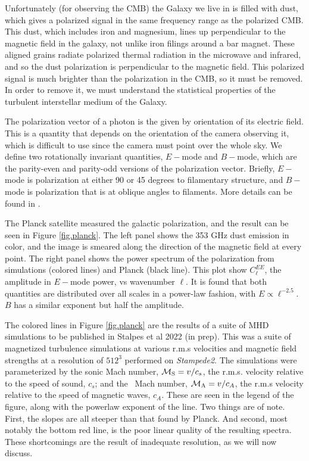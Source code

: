 Unfortunately (for observing the CMB) the Galaxy we live in is filled with dust,
which gives a polarized signal in the same frequency range as the polarized CMB.
This dust, which includes iron and magnesium, lines up perpendicular to the magnetic
field in the galaxy, not unlike iron filings around a bar magnet.  These aligned
grains radiate polarized thermal radiation in the microwave and infrared, and so
the dust polarization is perpendicular to the magnetic field.  This
polarized signal is much brighter than the polarization in the CMB, so it must be
removed.  In order to remove it, we must understand the statistical properties
of the turbulent interstellar medium of the Galaxy.

The polarization vector of a photon is the given by orientation of its electric field.  This is
a quantity that depends on the orientation of the camera observing it, which is
difficult to use since the camera must point over the whole sky.  We define two
rotationally invariant quantities, $E-$mode and $B-$mode, which are the
parity-even and parity-odd versions of the polarization vector.  Briefly,
$E-$mode is polarization at either 90 or 45 degrees to filamentary structure,
and $B-$mode is polarization that is at oblique angles to filaments.  More
details can be found in \citet{Rotti19}.  

The Planck satellite \citep{PlanckXIX15} measured the galactic polarization, and the result can be
seen in Figure \ref{fig.planck}.  The left panel shows the 353 GHz dust emission in color,
and the image is smeared along the direction of the magnetic field at every
point.  The right panel shows the power spectrum of the polarization from
simulations (colored lines) and Planck (black line).   This plot show
$C_\ell^{EE}$, the amplitude in $E-$mode power, vs wavenumber $\ell$.
It is found \citep{PlanckXIX15} that both quantities are
distributed over all scales in a power-law fashion, with $E \propto
\ell^{-2.5}$.
$B$ has a similar exponent but half the
amplitude.  

The colored lines in Figure \ref{fig.planck} are the results of a suite of MHD
simulations to be published in Stalpes et al 2022 (in prep).  This was a suite
of magnetized turbulence simulations at various r.m.s velocities and magnetic
field strengths at a resolution of $512^3$ performed on \emph{Stampede2}.  The
simulations were parameterized by the sonic Mach number, $\mathcal{M_{\rm{S}}}=v/c_s$, the r.m.s.
velocity relative to the speed of sound, $c_s$; and the \alf\ Mach number,
$\mathcal{M_{\rm{A}}}=v/c_A$, the
r.m.s velocity relative to the speed of magnetic waves, $c_A$.  These are seen
in the legend of the figure, along with the powerlaw exponent of the line.  Two things are
of note.  First, the slopes are all steeper than that found by Planck.  And
second, most notably the bottom red line, is the poor linear quality of the
resulting spectra.  These shortcomings are the result of inadequate resolution,
as we will now discuss.

